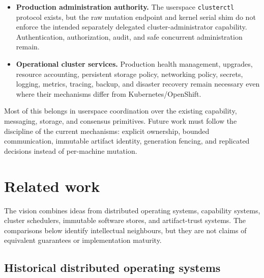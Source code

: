 \begin{itemize}
    \item \textbf{Production administration authority.} The userspace
        \texttt{clusterctl} protocol exists, but the raw mutation endpoint
        and kernel serial shim do not enforce the intended separately
        delegated cluster-administrator capability. Authentication,
        authorization, audit, and safe concurrent administration remain.

    \item \textbf{Operational cluster services.} Production health
        management, upgrades, resource accounting, persistent storage
        policy, networking policy, secrets, logging, metrics, tracing,
        backup, and disaster recovery remain necessary even where their
        mechanisms differ from Kubernetes/OpenShift.
\end{itemize}

Most of this belongs in userspace coordination over the existing capability,
messaging, storage, and consensus primitives. Future work must follow the
discipline of the current mechanisms: explicit ownership, bounded
communication, immutable artifact identity, generation fencing, and
replicated decisions instead of per-machine mutation.

\section{Related work}

The vision combines ideas from distributed operating systems, capability
systems, cluster schedulers, immutable software stores, and artifact-trust
systems. The comparisons below identify intellectual neighbours, but they are
not claims of equivalent guarantees or implementation maturity.

\subsection{Historical distributed operating systems}

